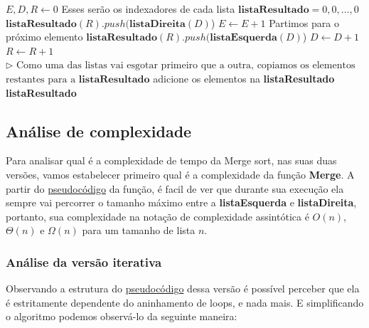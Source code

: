 \begin{algorithm}
	\label{algo:merge_aux_pseudo}
	\begin{algorithmic}[1]
		\Statex
		\State $E, D, R \gets 0$ \Comment Esses serão os indexadores de cada lista
		\State $\mathbf{listaResultado} = 0, 0,\ldots, 0$
		\State $\mathbf{listaResultado}(R).push(\mathbf{listaDireita}(D)$)
		\State $E \gets E + 1$ \Comment Partimos para o próximo elemento
		\Else
		\State $\mathbf{listaResultado}(R).push(\mathbf{listaEsquerda}(D)$)
		\State $D \gets D + 1$
		\EndIf
		\State $R \gets R + 1$
		\EndWhile
		\State $\rhd \text{ Como uma das listas vai esgotar primeiro que a outra, copiamos os elementos}$
		\State $\text{restantes para a }\mathbf{listaResultado}$
		\State adicione os elementos na \textbf{listaResultado}
		\EndWhile
		\State \Return \textbf{listaResultado}
		\EndFunction
	\end{algorithmic}
\end{algorithm}

\subsection{Análise de complexidade}
\label{anal:merge_sort}

Para analisar qual é a complexidade de tempo da Merge sort, nas suas duas versões, vamos estabelecer primeiro qual é a complexidade da função \textbf{Merge}. A partir do \href{algo:merge_aux_pseudo}{pseudocódigo} da função, é facil de ver que durante sua execução ela sempre vai percorrer o tamanho máximo entre a \textbf{listaEsquerda} e \textbf{listaDireita}, portanto, sua complexidade na notação de complexidade assintótica é $O(n)$, $\Theta(n)$ e $\Omega(n)$ para um tamanho de lista $n$.

\subsubsection{Análise da versão iterativa}

Observando a estrutura do \href{algo:merge_sort_it_pseudo}{pseudocódigo} dessa versão é possível perceber que ela é estritamente dependente do aninhamento de loops, e nada mais. E simplificando o algoritmo podemos observá-lo da seguinte maneira:

